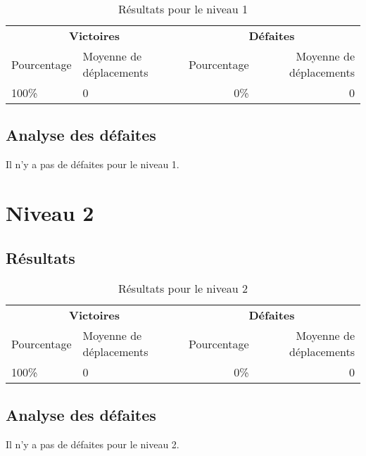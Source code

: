 \begin{table}[!htpb]
    \begin{tabularx}{\textwidth}{lXrr}
        \toprule
        \multicolumn{2}{c}{\textbf{Victoires}} & \multicolumn{2}{c}{\textbf{Défaites}} \\
        \cmidrule(lr){1-2} \cmidrule(lr){3-4}
        Pourcentage & Moyenne de déplacements & Pourcentage & Moyenne de déplacements \\
        \midrule
        100\% & 0 & 0\% & 0 \\
        \bottomrule
    \end{tabularx}
    \caption{Résultats pour le niveau 1}
    \label{tab:res-niveau-1}
\end{table}

\subsection{Analyse des défaites}

Il n'y a pas de défaites pour le niveau 1.

\section{Niveau 2}

\subsection{Résultats}

\begin{table}[!htpb]
    \begin{tabularx}{\textwidth}{lXrr}
        \toprule
        \multicolumn{2}{c}{\textbf{Victoires}} & \multicolumn{2}{c}{\textbf{Défaites}} \\
        \cmidrule(lr){1-2} \cmidrule(lr){3-4}
        Pourcentage & Moyenne de déplacements & Pourcentage & Moyenne de déplacements \\
        \midrule
        100\% & 0 & 0\% & 0 \\
        \bottomrule
    \end{tabularx}
    \caption{Résultats pour le niveau 2}
    \label{tab:res-niveau-2}
\end{table}

\subsection{Analyse des défaites}

Il n'y a pas de défaites pour le niveau 2.

